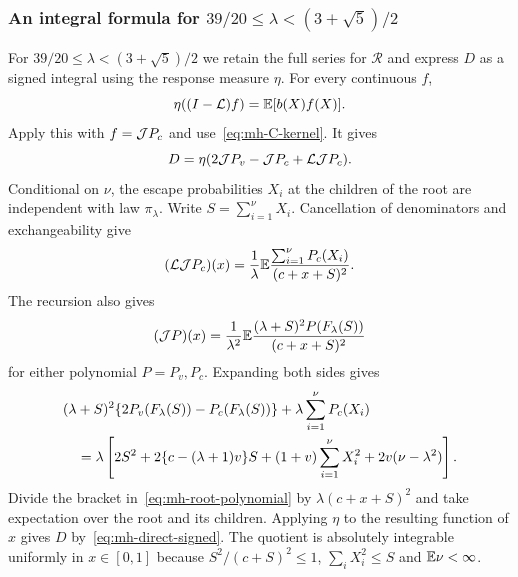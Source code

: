 \subsubsection{An integral formula for \texorpdfstring{$39/20\le\lambda<(3+\sqrt5)/2$}{39/20 <= lambda < (3+sqrt(5))/2}}
For $39/20\le\lambda<(3+\sqrt5)/2$ we retain the full series for $\mathcal R$ and express $D$ as a signed integral using the response measure $\eta$.
For every continuous $f$,
\[
 \eta((I-\mathcal L)f)=\mathbb E[b(X)f(X)].
\]
Apply this with $f=\mathcal J P_c$ and use~\eqref{eq:mh-C-kernel}. It gives
\begin{equation}\label{eq:mh-direct-signed}
 D=\eta(2\mathcal J P_v-\mathcal J P_c+\mathcal L\mathcal J P_c).
\end{equation}
Conditional on $\nu$, the escape probabilities $X_i$ at the children of the root are independent with law $\pi_\lambda$. Write $S=\sum_{i=1}^\nu X_i$. Cancellation of denominators and exchangeability give
\[
 (\mathcal L\mathcal J P_c)(x)
 =\frac1\lambda\mathbb E\frac{\sum_{i=1}^\nu P_c(X_i)}{(c+x+S)^2}.
\]
The recursion also gives
\[
 (\mathcal J P)(x)=\frac1{\lambda^2}
 \mathbb E\frac{(\lambda+S)^2P(F_\lambda(S))}{(c+x+S)^2}
\]
for either polynomial $P=P_v,P_c$. Expanding both sides gives
\begin{align}\label{eq:mh-root-polynomial}
 &(\lambda+S)^2\{2P_v(F_\lambda(S))-P_c(F_\lambda(S))\}
       +\lambda\sum_{i=1}^\nu P_c(X_i)\notag\\
 &\quad=\lambda\left[
 2S^2+2\{c-(\lambda+1)v\}S
 +(1+v)\sum_{i=1}^\nu X_i^2+2v(\nu-\lambda^2)\right].
\end{align}
Divide the bracket in~\eqref{eq:mh-root-polynomial} by $\lambda(c+x+S)^2$ and take expectation over the root and its children. Applying $\eta$ to the resulting function of $x$ gives $D$ by~\eqref{eq:mh-direct-signed}. The quotient is absolutely integrable uniformly in $x\in[0,1]$ because $S^2/(c+S)^2\le1$, $\sum_iX_i^2\le S$ and $\mathbb E\nu<\infty$.

